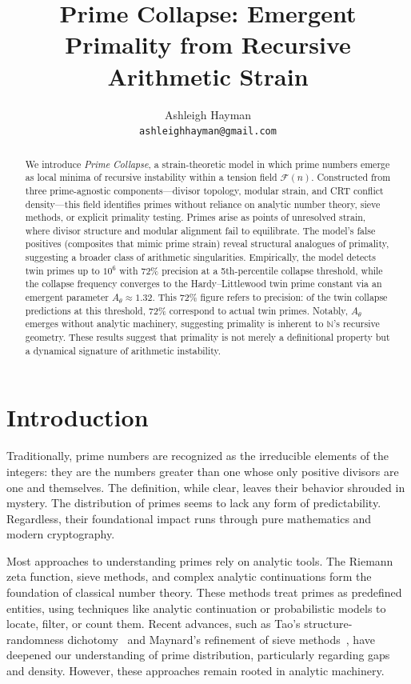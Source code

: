 \documentclass[11pt]{article}
\title{Prime Collapse: Emergent Primality from Recursive Arithmetic Strain}
\author{
Ashleigh Hayman \\
\texttt{ashleighhayman@gmail.com}
}
\date{}
\begin{document}
\maketitle

\begin{abstract}
We introduce \textit{Prime Collapse}, a strain-theoretic model in which prime numbers emerge as local minima of recursive instability within a tension field $\mathcal{F}(n)$. Constructed from three prime-agnostic components—divisor topology, modular strain, and CRT conflict density—this field identifies primes without reliance on analytic number theory, sieve methods, or explicit primality testing. Primes arise as points of unresolved strain, where divisor structure and modular alignment fail to equilibrate. The model's false positives (composites that mimic prime strain) reveal structural analogues of primality, suggesting a broader class of arithmetic singularities. Empirically, the model detects twin primes up to $10^6$ with 72\% precision at a 5th-percentile collapse threshold, while the collapse frequency converges to the Hardy–Littlewood twin prime constant via an emergent parameter $A_\theta \approx 1.32$. This 72\% figure refers to precision: of the twin collapse predictions at this threshold, 72\% correspond to actual twin primes. Notably, $A_\theta$ emerges without analytic machinery, suggesting primality is inherent to $\mathbb{N}$'s recursive geometry. These results suggest that primality is not merely a definitional property but a dynamical signature of arithmetic instability.
\end{abstract}

\section{Introduction}

Traditionally, prime numbers are recognized as the irreducible elements of the integers: they are the numbers greater than one whose only positive divisors are one and themselves. The definition, while clear, leaves their behavior shrouded in mystery. The distribution of primes seems to lack any form of predictability. Regardless, their foundational impact runs through pure mathematics and modern cryptography.

Most approaches to understanding primes rely on analytic tools. The Riemann zeta function, sieve methods, and complex analytic continuations form the foundation of classical number theory. These methods treat primes as predefined entities, using techniques like analytic continuation or probabilistic models to locate, filter, or count them. Recent advances, such as Tao's structure-randomness dichotomy~\cite{tao} and Maynard's refinement of sieve methods~\cite{maynard}, have deepened our understanding of prime distribution, particularly regarding gaps and density. However, these approaches remain rooted in analytic machinery.
\end{document}
